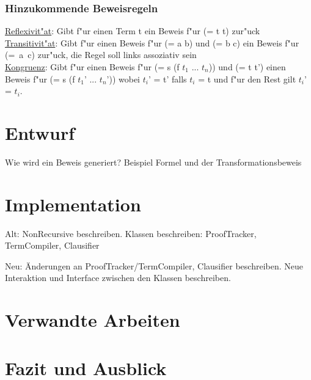 \documentclass[a4paper]{article}
\begin{document}
\subsubsection{Hinzukommende Beweisregeln}
\uline{Reflexivit"at}: Gibt f"ur einen Term t ein Beweis f"ur (= t t) zur"uck\\
\uline{Transitivit"at}: Gibt f"ur einen Beweis f"ur (= a b) und (= b c) ein Beweis f"ur \mbox{(= a c)} zur"uck, die Regel soll links assoziativ sein\\
\uline{Kongruenz}: Gibt f"ur einen Beweis f"ur (= s (f $t_1$ ... $t_n$)) und (= t t') einen Beweis f"ur (= s (f $t_1$' ... $t_n$')) wobei $t_i$' = t' falls $t_i$ = t und f"ur den Rest gilt $t_i$' = $t_i$.\\



\section{Entwurf}

Wie wird ein Beweis generiert?
Beispiel Formel und der Transformationsbeweis

\section{Implementation}

Alt:
NonRecursive beschreiben.
Klassen beschreiben: ProofTracker, TermCompiler, Clausifier

Neu:
Änderungen an ProofTracker/TermCompiler, Clausifier beschreiben.
Neue Interaktion und Interface zwischen den Klassen beschreiben.


\section{Verwandte Arbeiten}

\section{Fazit und Ausblick}


\end{document}
